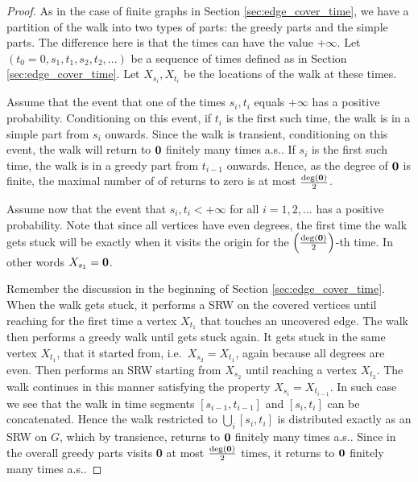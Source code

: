 \documentclass[12pt,a4paper]{article}
\newcommand{\0}{{\bf 0}}
\begin{document}
    \begin{proof}
        As in the case of finite graphs in Section \ref{sec:edge_cover_time}, we have a partition of the walk into
        two types of parts: the greedy parts and the simple parts.
        The difference here is that the times can have the value $+\infty$.
        Let $(t_0 = 0,s_1,t_1,s_2,t_2,...)$ be a sequence of times defined as in Section \ref{sec:edge_cover_time}.
        Let $X_{s_i}, X_{t_i}$ be the locations of the walk at these times.

        Assume that the event that one of the times $s_i,t_i$ equals $+\infty$ has a positive probability.
        Conditioning on this event, if $t_i$ is the first such time, the walk is in a simple part from $s_i$ onwards. Since the walk is transient, conditioning on this event, the walk will return to $\0$ finitely many times a.s.. If $s_i$ is the first such time, the walk is in a greedy part from $t_{i-1}$ onwards.
        Hence, as the degree of $\0$ is finite, the maximal number of of returns to zero is at most $\frac{\deg(\0)}{2}$.

        Assume now that the event that $s_i,t_i<+\infty$ for all $i=1,2,... $ has a positive probability.
        Note that since all vertices have even degrees, the first time the walk gets stuck
        will be exactly when it visits the origin for the $\left(\frac{\deg(\0)}{2} \right)$-th time. In other words $X_{s_1} = \0$.

        Remember the discussion in the beginning of Section \ref{sec:edge_cover_time}. When the walk gets stuck, it performs a SRW on the covered vertices until reaching for the first time a vertex $X_{t_1}$ that touches an uncovered edge.
        The walk then performs a greedy walk until gets stuck again.
        It gets stuck in the same vertex $X_{t_1}$, that it started from, i.e.\ $X_{s_2} = X_{t_1}$, again because all degrees are even.
        Then performs an SRW starting from $X_{s_2}$ until reaching a vertex $X_{t_2}$.
        The walk continues in this manner satisfying the property $X_{s_i} = X_{t_{i-1}}$.
        In such case we see that the walk in time segments $[s_{i-1}, t_{i-1}]$ and $[s_i,t_i]$ can be concatenated.
        Hence the walk restricted to $\bigcup_i [s_i,t_i]$ is distributed exactly as an SRW on $G$,
        which by transience, returns to $\0$ finitely many times a.s..
        Since in the overall greedy parts visits \0 at most $\frac{\deg(\0)}{2}$ times, it returns to $\0$ finitely many times a.s..
    \end{proof}
\end{document}
